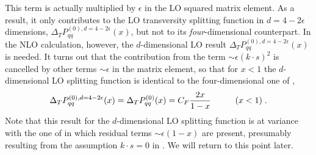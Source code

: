 \begin{itemize}
\begin{equation}
\end{equation}
This term is actually multiplied by $\epsilon$ in the LO squared matrix 
element. As a result, it only contributes to the LO transversity splitting 
function in $d=4-2 \epsilon$ dimensions, $\Delta_T P_{qq}^{(0),d=4-2 \epsilon} 
(x)$, but not to its {\em four}-dimensional counterpart. In the NLO 
calculation, however, the $d$-dimensional LO result $\Delta_T 
P_{qq}^{(0),d=4-2 \epsilon} (x)$ is needed. It turns out that the 
contribution from the term $\sim \epsilon (k \cdot s)^2$ is cancelled by 
other terms $\sim \epsilon$ in the matrix element, so that for $x<1$ the 
$d$-dimensional LO splitting function is identical to the 
four-dimensional one of \cite{am},
\begin{equation} \label{losplitd}
\Delta_T P_{qq}^{(0),d=4-2 \epsilon}(x) = \Delta_T P_{qq}^{(0)} (x) =
C_F \frac{2 x}{1-x} \hspace*{1cm} (x<1) \; .
\end{equation}
Note that this result for the $d$-dimensional LO splitting function is at
variance with the one of \cite{basim} in which residual terms $\sim \epsilon
(1-x)$ are present, presumably resulting from the assumption $k\cdot s=0$
in \cite{basim}. We will return to this point later. 


\end{itemize}
